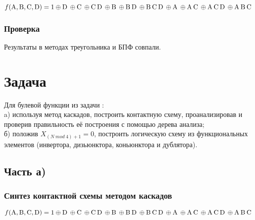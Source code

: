 \documentclass[a4paper, 14pt]{extarticle}
\begin{document}
\begin{equation*}
  f(\text{A}, \text{B}, \text{C}, \text{D}) = 1 \oplus \text{D} \hspace{2pt} \oplus \text{C} \hspace{2pt} \oplus
  \text{C} \hspace{2pt}\text{D} \hspace{2pt} \oplus \text{B} \hspace{2pt} \oplus \text{B} \hspace{2pt}\text{D} \hspace{2pt} \oplus \text{B} \hspace{2pt}\text{C} \hspace{2pt}\text{D} \hspace{2pt} \oplus
  \text{A} \hspace{2pt} \oplus \text{A} \hspace{2pt}\text{C} \hspace{2pt} \oplus \text{A} \hspace{2pt}\text{C} \hspace{2pt}\text{D} \hspace{2pt} \oplus \text{A} \hspace{2pt}\text{B} \hspace{2pt}\text{C} \hspace{2pt}
\end{equation*}

\subsubsection{Проверка}

Результаты в методах треугольника и БПФ совпали. 

\newpage

\section{Задача }

Для булевой функции из задачи : \\

a) используя метод каскадов, построить контактную
схему, проанализировав и проверив правильность её построения с помощью дерева
анализа;\\

б) положив $X_{(N \hspace{3pt} mod \hspace{3pt} 4)+1} = 0$, построить логическую схему из функциональных
элементов (инвертора, дизьюнктора, коньюнктора и дублятора).

\subsection{Часть а)}

\subsubsection{Синтез контактной схемы методом каскадов}

\begin{equation*}
  f(\text{A}, \text{B}, \text{C}, \text{D}) = 1 \oplus \text{D} \hspace{2pt} \oplus \text{C} \hspace{2pt} \oplus
  \text{C} \hspace{2pt}\text{D} \hspace{2pt} \oplus \text{B} \hspace{2pt} \oplus \text{B} \hspace{2pt}\text{D} \hspace{2pt} \oplus \text{B} \hspace{2pt}\text{C} \hspace{2pt}\text{D} \hspace{2pt} \oplus
  \text{A} \hspace{2pt} \oplus \text{A} \hspace{2pt}\text{C} \hspace{2pt} \oplus \text{A} \hspace{2pt}\text{C} \hspace{2pt}\text{D} \hspace{2pt} \oplus \text{A} \hspace{2pt}\text{B} \hspace{2pt}\text{C} \hspace{2pt}
\end{equation*}
\end{document}

